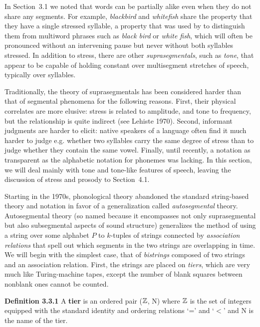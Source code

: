 In Section~3.1 we noted that words can be partially alike even when they do
not share any segments. For example, {\it blackbird} and {\it whitefish} share
the property that they have a single stressed syllable, a property that was
used by  to distinguish them from multiword phrases
such as {\it black bird} or {\it white fish}, which will often be pronounced
without an intervening pause but never without both syllables
stressed.  In addition to stress,
there are other {\it suprasegmentals}, such as {\it tone}, that appear to be
capable of holding constant over multisegment stretches of speech, typically
over syllables.

Traditionally, the theory of suprasegmentals has been considered harder than
that of segmental phenomena for the following reasons. First, their physical
correlates are more elusive: stress is related to amplitude, and tone to
frequency, but the relationship is quite indirect (see \nocite{Lehiste:1970}
Lehiste 1970). Second, informant judgments are harder to elicit: native
speakers of a language often find it much harder to judge e.g. whether two
syllables carry the same degree of stress than to judge whether they contain
the same vowel. Finally, until recently, a notation as transparent as the
alphabetic notation for phonemes was lacking. In this section, we will deal
mainly with tone and tone-like features of speech, leaving the discussion of
stress and prosody to Section~4.1.

Starting in the 1970s, phonological theory abandoned the standard string-based
theory and notation in favor of a generalization called {\it autosegmental}
theory. Autosegmental theory (so named because it encompasses not only
suprasegmental but also subsegmental aspects of sound structure) generalizes
the method of using a string over some alphabet $P$ to 
$k$-tuples of strings connected by {\it association relations} that spell out
which segments in the two strings are overlapping in time.  We will begin with
the simplest case, that of {\it bistrings} composed of two strings and an
association relation. First, the strings are placed on {\it tiers}, which are
very much like Turing-machine tapes, except the number of blank squares
between nonblank ones cannot be counted. 
 

\smallskip\noindent
{\bf Definition 3.3.1} A {\bf tier} is an ordered pair ($\Bbb Z$, N) where
$\Bbb Z$ is the set of integers equipped with the standard identity and
ordering relations `=' and `$<$' and N is the name of the tier.

